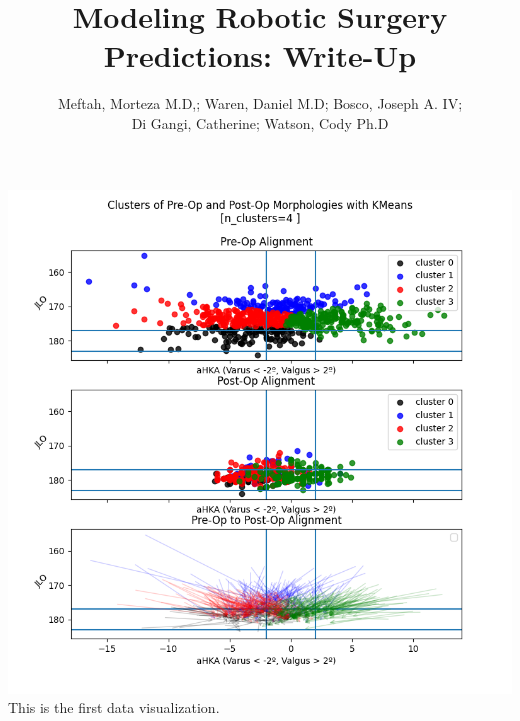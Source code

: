 \documentclass{article}
\author{Meftah, Morteza M.D,; Waren, Daniel M.D; Bosco, Joseph A. IV;\\
Di Gangi, Catherine; Watson, Cody Ph.D}
\title{Modeling Robotic Surgery Predictions: Write-Up}
\begin{document}
\maketitle

\includegraphics[scale=.5]{data_vis.png}\\

This is the first data visualization.
\end{document}
